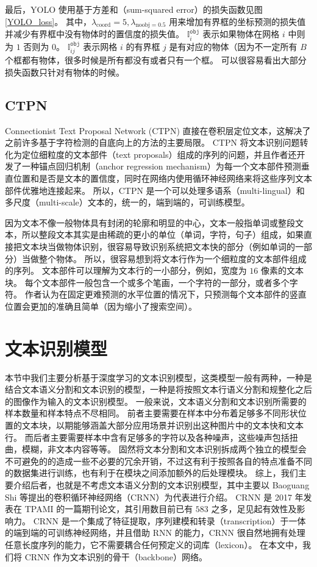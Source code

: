 最后，YOLO 使用基于方差和（sum-squared error）的损失函数见图\ref{YOLO_loss}。
其中，$\lambda_{\text{coord}} = 5, \lambda_{\text{noobj} = 0.5}$ 用来增加有界框的坐标预测的损失值并减少有界框中没有物体时的置信度的损失值。
$\mathbb{I}_i^{\texttt{obj}}$ 表示如果物体在网格 $i$ 中则为 $1$ 否则为 $0$。
$\mathbb{I}^{\texttt{obj}}_{ij}$ 表示网格 $i$ 的有界框 $j$ 是有对应的物体（因为不一定所有 $B$ 个框都有物体，很多时候是所有都没有或者只有一个框。
可以很容易看出大部分损失函数只针对有物体的时候。

\subsection{CTPN}
Connectionist Text Proposal Network (CTPN) 直接在卷积层定位文本，这解决了之前许多基于字符检测的自底向上的方法的主要局限。
CTPN 将文本识别问题转化为定位细粒度的文本部件（text proposals）组成的序列的问题，并且作者还开发了一种锚点回归机制（anchor regression mechanism）为每一个文本部件预测垂直位置和是否是文本的置信度，同时在网络内使用循环神经网络来将这些序列文本部件优雅地连接起来。
所以，CTPN 是一个可以处理多语系（multi-lingual）和多尺度（multi-scale）文本的，统一的，端到端的，可训练模型。

因为文本不像一般物体具有封闭的轮廓和明显的中心，文本一般指单词或整段文本，所以整段文本其实是由稀疏的更小的单位（单词，字符，句子）组成，如果直接把文本块当做物体识别，很容易导致识别系统把文本快的部分（例如单词的一部分）当做整个物体。
所以，很容易想到将文本行作为一个细粒度的文本部件组成的序列。
文本部件可以理解为文本行的一小部分，例如，宽度为 $16$ 像素的文本块。
每个文本部件一般包含一个或多个笔画，一个字符的一部分，或者多个字符。
作者认为在固定更难预测的水平位置的情况下，只预测每个文本部件的竖直位置会更加的准确且简单（因为缩小了搜索空间）。

\section{文本识别模型}
本节中我们主要分析基于深度学习的文本识别模型，这类模型一般有两种，一种是结合文本语义分割和文本识别的模型，一种是将按照文本行语义分割和规整化之后的图像作为输入的文本识别模型。
一般来说，文本语义分割和文本识别所需要的样本数量和样本特点不尽相同。
前者主要需要在样本中分布着足够多不同形状位置的文本块，以期能够涵盖大部分应用场景并识别出这种图片中的文本快和文本行。
而后者主要需要样本中含有足够多的字符以及各种噪声，这些噪声包括扭曲，模糊，非文本内容等等。
固然将文本分割和文本识别拆成两个独立的模型会不可避免的的造成一些不必要的冗余开销，不过这有利于按照各自的特点准备不同的数据集进行训练，也有利于在模块之间添加额外的后处理模块。
综上，我们主要介绍后者，也就是不考虑文本语义分割的文本识别模型，其中主要以 Baoguang Shi 等提出的卷积循环神经网络（CRNN）\cite{CRNN}为代表进行介绍。
CRNN 是 2017 年发表在 TPAMI 的一篇期刊论文，其引用数目前已有 $583$ 之多，足见起有效性及影响力。
CRNN 是一个集成了特征提取，序列建模和转录（transcription）于一体的端到端的可训练神经网络，并且借助 RNN 的能力，CRNN 很自然地拥有处理任意长度序列的能力，它不需要耦合任何预定义的词库（lexicon）。
在本文中，我们将 CRNN 作为文本识别的骨干（backbone）网络。

